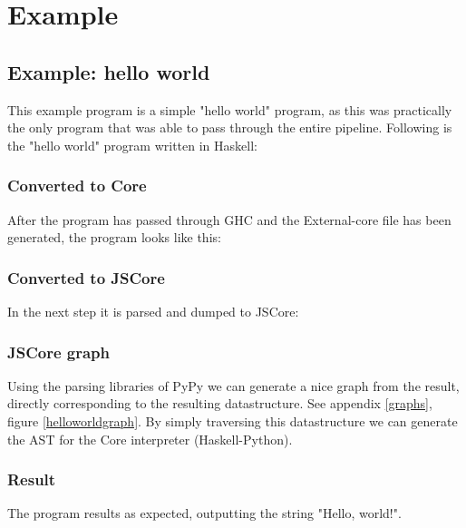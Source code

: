 
\section{Example}


\subsection{Example: hello world}

This example program is a simple "hello world" program, as this was practically
the only program that was able to pass through the entire pipeline. Following
is the "hello world" program written in Haskell:



\subsubsection{Converted to Core}

After the program has passed through GHC and the External-core file
has been generated, the program looks like this:



\subsubsection{Converted to JSCore}

In the next step it is parsed and dumped to JSCore:



\subsubsection{JSCore graph}

Using the parsing libraries of PyPy we can generate a nice graph from the result,
directly corresponding to the resulting datastructure. 
See appendix \ref{graphs}, figure \ref{helloworldgraph}.
By simply traversing this datastructure we can generate the AST for the Core 
interpreter (Haskell-Python).

\subsubsection{Result}

The program results as expected, outputting the string "Hello, world!".









